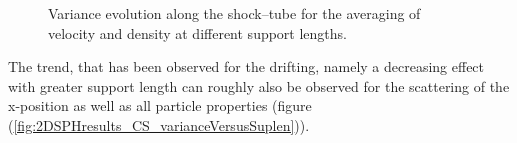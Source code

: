 \documentclass{report}
\begin{document}
\begin{figure}[!htbp]
\centering
\label{fig:2DSPHresults_CS_variance}

\caption[]{Variance evolution along the shock--tube for the averaging of velocity and density at different support lengths.}

\end{figure}

The trend, that has been observed for the drifting, namely a decreasing effect with greater support length can roughly also be observed for the scattering of the x-position as well as all particle properties (figure (\ref{fig:2DSPHresults_CS_varianceVersusSuplen})).
\end{document}
